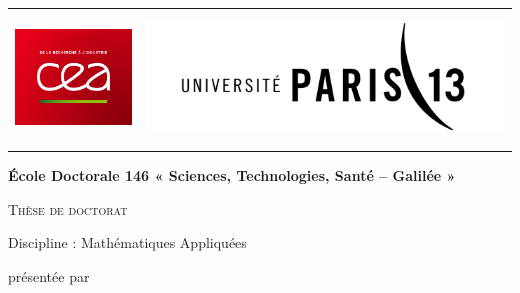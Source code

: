 \hypersetup{pageanchor=false}
\begin{titlepage}
 
\vspace{-1cm}
\begin{minipage}[t]{1.2\textwidth}
\begin{center}
  \begin{tabularx}{\textwidth}{@{\extracolsep{\fill}}lr}
  \includegraphics[height = 3cm]{images/logo/CEA.png} &
  \includegraphics[height = 3.5cm]{images/logo/P13.png}
  \end{tabularx}
\end{center}
\end{minipage}
\vspace{1cm}

\begin{center}
{\Large \textbf{École Doctorale 146 « Sciences, Technologies, Santé – Galilée »}}


{\Huge \textsc{Thèse de doctorat}}


{\LARGE Discipline : Mathématiques Appliquées}


{\large présentée par}


\end{center}
\end{titlepage}
